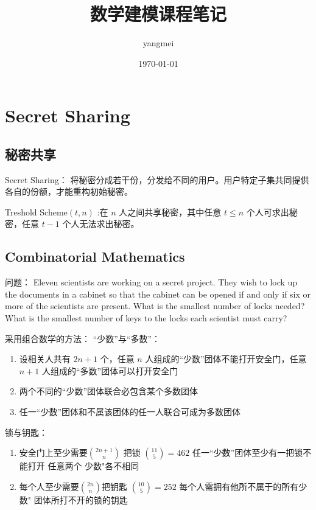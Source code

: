 \documentclass[12pt, a4paper, oneside]{ctexbook}
\title{{\Huge{\textbf{数学建模课程笔记}}}}
\author{yangmei}
\date{\today}
\begin{document}
\maketitle





\newpage
{}
\setcounter{page}{1}
\tableofcontents
\newpage
\setcounter{page}{1}
 
\chapter{Secret Sharing}
\section{秘密共享}

Secret Sharing： 将秘密分成若干份，分发给不同的用户。用户特定子集共同提供各自的份额，才能重构初始秘密。

Treshold Scheme$(t,n)$ :在 $n$ 人之间共享秘密，其中任意 $t\le n$ 个人可求出秘密，任意 $t-1$ 个人无法求出秘密。
\section{Combinatorial Mathematics}
问题：
Eleven scientists are working on a secret project. They wish to lock up the documents in a cabinet so that the cabinet can be opened if and only if six or more of the scientists are present. What is the smallest number of locks needed? What is the smallest number of keys to the locks each scientist must carry?

采用组合数学的方法：
“少数”与“多数”：
\begin{enumerate}
    \item 设相关人共有 $2n+1$ 个，任意 $n$ 人组成的“少数”团体不能打开安全门，任意 $n+1$ 人组成的“多数”团体可以打开安全门  
    \item 两个不同的“少数”团体联合必包含某个多数团体  
    \item 任一“少数”团体和不属该团体的任一人联合可成为多数团体        
\end{enumerate}
锁与钥匙：
\begin{enumerate}
    \item 安全门上至少需要$\binom{2n+1}n$ 把锁 $\binom{11}5=462$
    \subitem 任一“少数”团体至少有一把锁不能打开
    \subitem 任意两个 少数"各不相同
    \item 每个人至少需要$\binom{2n}n$把钥匙 $\binom{10}5 = 252$
    每个人需拥有他所不属于的所有少数" 团体所打不开的锁的钥匙 
\end{enumerate}
\end{document}
